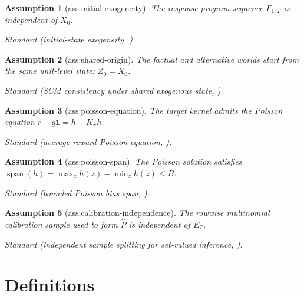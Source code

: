 \documentclass{article}
\newtheorem{assumption}{Assumption}
\begin{document}
\begin{assumption}[ass:initial-exogeneity]\label{ass:initial-exogeneity}
The response-program sequence \(F_{1:T}\) is independent of \(X_0\).
\par\smallskip\noindent\emph{Standard} (initial-state exogeneity, \cite{OberstSontag2019}).
\end{assumption}

\begin{assumption}[ass:shared-origin]\label{ass:shared-origin}
The factual and alternative worlds start from the same unit-level state: \(Z_0=X_0\).
\par\smallskip\noindent\emph{Standard} (SCM consistency under shared exogenous state, \cite{OberstSontag2019}).
\end{assumption}

\begin{assumption}[ass:poisson-equation]\label{ass:poisson-equation}
The target kernel admits the Poisson equation \(r-g\mathbf 1=h-K_{\pi}h\).
\par\smallskip\noindent\emph{Standard} (average-reward Poisson equation, \cite{SayedanaCainesMahajan2025}).
\end{assumption}

\begin{assumption}[ass:poisson-span]\label{ass:poisson-span}
The Poisson solution satisfies \(\operatorname{span}(h)=\max_z h(z)-\min_z h(z)\le B\).
\par\smallskip\noindent\emph{Standard} (bounded Poisson bias span, \cite{SayedanaCainesMahajan2025}).
\end{assumption}

\begin{assumption}[ass:calibration-independence]\label{ass:calibration-independence}
The rowwise multinomial calibration sample used to form \(\widehat P\) is independent of \(E_T\).
\par\smallskip\noindent\emph{Standard} (independent sample splitting for set-valued inference, \cite{KaidoMolinariStoye2019CalibratedProjection}).
\end{assumption}

\section{Definitions}
\end{document}
